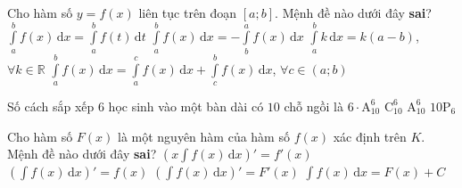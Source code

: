 \begin{ex}%
    Cho hàm số $y=f(x)$ liên tục trên đoạn $[a;b]$. Mệnh đề nào dưới đây \textbf{sai}?
    \choice
    {$\displaystyle\int\limits_a^b f(x) \mathrm{\,d}x=\displaystyle\int\limits_a^b f(t) \mathrm{\,d}t$}
    {$\displaystyle\int\limits_a^b f(x) \mathrm{\,d}x=-\displaystyle\int\limits_b^a f(x) \mathrm{\,d}x$}
    {\True $\displaystyle\int\limits_a^b k \mathrm{\,d}x=k(a-b)$, $\forall k\in \mathbb{R}$}
    {$\displaystyle\int\limits_a^b f(x) \mathrm{\,d}x=\displaystyle\int\limits_a^c f(x) \mathrm{\,d}x+\displaystyle\int\limits_c^b f(x) \mathrm{\,d}x$, $\forall c\in (a;b)$}
\end{ex}

\begin{ex}%
    Số cách sắp xếp $6$ học sinh vào một bàn dài có $10$ chỗ ngồi là
    \choice
    {$6\cdot\mathrm{A}_{10}^6$}
    {$\mathrm{C}_{10}^6$}
    {\True $\mathrm{A}_{10}^6$}
    {$10\mathrm{P}_6$}
\end{ex}

\begin{ex}%
    Cho hàm số $F(x)$ là một nguyên hàm của hàm số $f(x)$ xác định trên $K$. Mệnh đề nào dưới đây \textbf{sai}?
    \choice
    {\True ${\left(x\displaystyle\int f(x) \mathrm{\,d}x\right)}'=f'(x)$}
    {${\left(\displaystyle\int f(x) \mathrm{\,d}x\right)}'=f(x)$}
    {${\left(\displaystyle\int f(x) \mathrm{\,d}x\right)}'=F'(x)$}
    {$\displaystyle\int f(x) \mathrm{\,d}x=F(x)+C$}
\end{ex}

